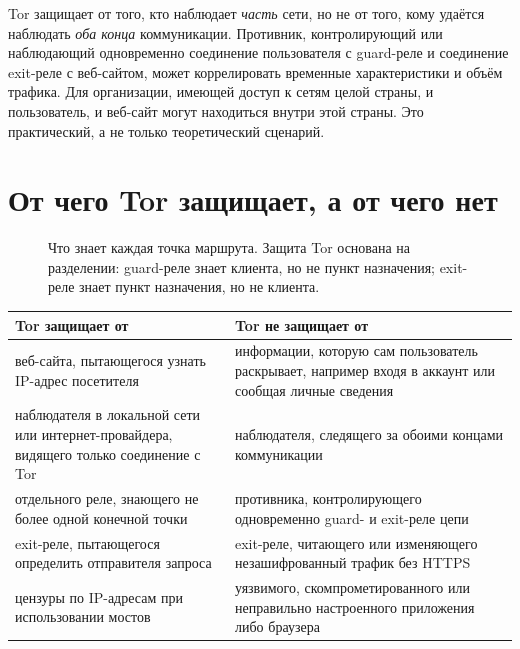 \begin{attenzione}
Tor защищает от того, кто наблюдает \emph{часть} сети, но не от того, кому удаётся наблюдать \emph{оба конца} коммуникации. Противник, контролирующий или наблюдающий одновременно соединение пользователя с guard-реле и соединение exit-реле с веб-сайтом, может коррелировать временные характеристики и объём трафика. Для организации, имеющей доступ к сетям целой страны, и пользователь, и веб-сайт могут находиться внутри этой страны. Это практический, а не только теоретический сценарий.
\end{attenzione}

\section{От чего Tor защищает, а от чего нет}\label{sec:minaccia-sintesi}

\begin{figure}[htbp]
\centering

\caption{Что знает каждая точка маршрута. Защита Tor основана на разделении: guard-реле знает клиента, но не пункт назначения; exit-реле знает пункт назначения, но не клиента.}
\label{fig:sapere}
\end{figure}

\begin{center}\small
\begin{tabularx}{\textwidth}{@{}>{\raggedright\arraybackslash}X>{\raggedright\arraybackslash}X@{}}
\toprule
Tor защищает от & Tor не защищает от \\
\midrule
веб-сайта, пытающегося узнать IP-адрес посетителя & информации, которую сам пользователь раскрывает, например входя в аккаунт или сообщая личные сведения \\
наблюдателя в локальной сети или интернет-провайдера, видящего только соединение с Tor & наблюдателя, следящего за обоими концами коммуникации \\
отдельного реле, знающего не более одной конечной точки & противника, контролирующего одновременно guard- и exit-реле цепи \\
exit-реле, пытающегося определить отправителя запроса & exit-реле, читающего или изменяющего незашифрованный трафик без HTTPS \\
цензуры по IP-адресам при использовании мостов & уязвимого, скомпрометированного или неправильно настроенного приложения либо браузера \\
\bottomrule
\end{tabularx}
\end{center}

